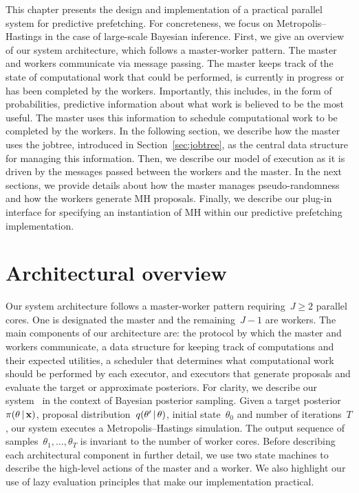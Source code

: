 \documentclass[angelino.tex]{subfiles}
\begin{document}
This chapter presents the design and implementation
of a practical parallel system for predictive prefetching.
For concreteness, we focus on Metropolis--Hastings in
the case of large-scale Bayesian inference.
First, we give an overview of our system architecture, which follows a
master-worker pattern.
The master and workers communicate via message passing.
The master keeps track of the state of computational work that could be
performed, is currently in progress or has been completed by the workers.
Importantly, this includes, in the form of probabilities, predictive information
about what work is believed to be the most useful.
The master uses this information to schedule computational work to be completed
by the workers.
In the following section, we describe how the master uses the jobtree,
introduced in Section~\ref{sec:jobtree}, as the central data structure for
managing this information.
Then, we describe our model of execution as it is driven by the messages passed
between the workers and the master.
In the next sections, we provide details about how the master manages
pseudo-randomness and how the workers generate MH proposals.
Finally, we describe our plug-in interface for specifying an instantiation of
MH within our predictive prefetching implementation.


\section{Architectural overview}
\label{sec:architecture}

Our system architecture follows a master-worker pattern requiring~${J \ge 2}$ parallel cores.
%
One is designated the master and the remaining~${J-1}$ are workers.
%
The main components of our architecture are:
the protocol by which the master and workers communicate,
a data structure for keeping track of computations and their expected utilities,
a scheduler that determines what computational work should be performed by each executor,
and executors that generate proposals and evaluate the target or approximate posteriors.
%
For clarity, we describe our system~ in the context of Bayesian posterior sampling.
%
Given a target posterior~$\pi(\theta \,|\, \mathbf{x})$,
proposal distribution~$q(\theta' \,|\, \theta)$,
initial state~$\theta_0$ and number of iterations~$T$,
our system executes a Metropolis--Hastings simulation.
%
The output sequence of samples~${\theta_1, \dots, \theta_T}$ 
is invariant to the number of worker cores.
%
Before describing each architectural component in further detail, we use two
state machines to describe the high-level actions of the master and a worker.
%
We also highlight our use of lazy evaluation principles that make our
implementation practical.
\end{document}
